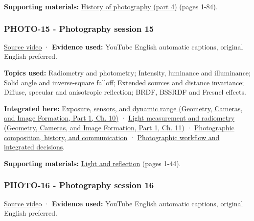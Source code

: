 \textbf{Supporting materials:} \href{https://drive.google.com/open?id=0B6w2XfPHEcZYTjRoLWhnSUFEYTQ}{History of photography (part 4)} (pages 1-84).

\subsubsection{PHOTO-15 - Photography session 15}\label{04-visual-computing-ii-ch036-photo-15---photography-session-15}

\hypertarget{04-visual-computing-ii-ch036-photo-15---photography-session-15}{}

\href{https://www.youtube.com/watch?v=kO68jM_1eho}{Source video} · \textbf{Evidence used:} YouTube English automatic captions, original English preferred.

\textbf{Topics used:} Radiometry and photometry; Intensity, luminance and illuminance; Solid angle and inverse-square falloff; Extended sources and distance invariance; Diffuse, specular and anisotropic reflection; BRDF, BSSRDF and Fresnel effects.

\textbf{Integrated here:} \href{../03-Geometry-Cameras-and-Image-Formation-P01/main.pdf\#03-visual-computing-i-ch003-exposure-sensors-and-dynamic-range}{Exposure, sensors, and dynamic range (Geometry, Cameras, and Image Formation, Part 1, Ch. 10)} · \href{../03-Geometry-Cameras-and-Image-Formation-P01/main.pdf\#03-visual-computing-i-ch004-light-measurement-and-radiometry}{Light measurement and radiometry (Geometry, Cameras, and Image Formation, Part 1, Ch. 11)} · \hyperref[04-visual-computing-ii-ch034-photographic-composition-history-and-communication]{Photographic composition, history, and communication} · \hyperref[04-visual-computing-ii-ch034-photographic-workflow-and-integrated-decisions]{Photographic workflow and integrated decisions}.

\textbf{Supporting materials:} \href{https://drive.google.com/open?id=0B6w2XfPHEcZYNHdYdjhMakktS28}{Light and reflection} (pages 1-44).

\subsubsection{PHOTO-16 - Photography session 16}\label{04-visual-computing-ii-ch036-photo-16---photography-session-16}

\hypertarget{04-visual-computing-ii-ch036-photo-16---photography-session-16}{}

\href{https://www.youtube.com/watch?v=gy-6WhxVIqc}{Source video} · \textbf{Evidence used:} YouTube English automatic captions, original English preferred.

